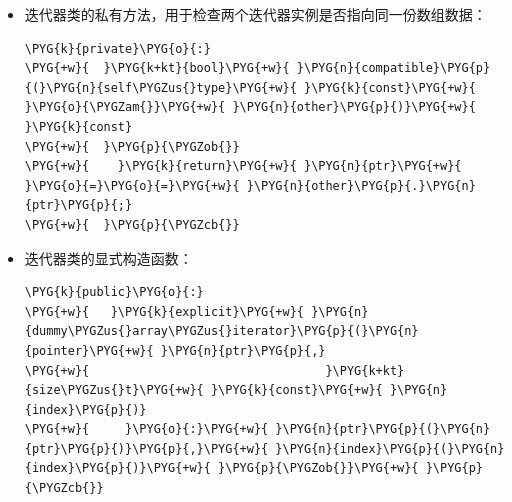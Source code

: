 \begin{itemize}

\begin{codeblockbg}
\begin{Verbatim}[commandchars=\\\{\},breaklines=true,breakanywhere=true,fontsize=\codefont,xleftmargin=17bp]
\PYG{k}{private}\PYG{o}{:}
\PYG{+w}{   }\PYG{n}{pointer}\PYG{+w}{ }\PYG{n}{ptr}\PYG{+w}{ }\PYG{o}{=}\PYG{+w}{ }\PYG{n+nb}{nullptr}\PYG{p}{;}
\PYG{+w}{   }\PYG{k+kt}{size\PYGZus{}t}\PYG{+w}{ }\PYG{n}{index}\PYG{+w}{ }\PYG{o}{=}\PYG{+w}{ }\PYG{l+m+mi}{0}\PYG{p}{;}
\end{Verbatim}
\end{codeblockbg}



\item 迭代器类的私有方法，用于检查两个迭代器实例是否指向同一份数组数据：



\begin{codeblockbg}
\begin{Verbatim}[commandchars=\\\{\},breaklines=true,breakanywhere=true,fontsize=\codefont,xleftmargin=17bp]
\PYG{k}{private}\PYG{o}{:}
\PYG{+w}{  }\PYG{k+kt}{bool}\PYG{+w}{ }\PYG{n}{compatible}\PYG{p}{(}\PYG{n}{self\PYGZus{}type}\PYG{+w}{ }\PYG{k}{const}\PYG{+w}{ }\PYG{o}{\PYGZam{}}\PYG{+w}{ }\PYG{n}{other}\PYG{p}{)}\PYG{+w}{ }\PYG{k}{const}
\PYG{+w}{  }\PYG{p}{\PYGZob{}}
\PYG{+w}{    }\PYG{k}{return}\PYG{+w}{ }\PYG{n}{ptr}\PYG{+w}{ }\PYG{o}{=}\PYG{o}{=}\PYG{+w}{ }\PYG{n}{other}\PYG{p}{.}\PYG{n}{ptr}\PYG{p}{;}
\PYG{+w}{  }\PYG{p}{\PYGZcb{}}
\end{Verbatim}
\end{codeblockbg}



\item 迭代器类的显式构造函数：



\begin{codeblockbg}
\begin{Verbatim}[commandchars=\\\{\},breaklines=true,breakanywhere=true,fontsize=\codefont,xleftmargin=17bp]
\PYG{k}{public}\PYG{o}{:}
\PYG{+w}{   }\PYG{k}{explicit}\PYG{+w}{ }\PYG{n}{dummy\PYGZus{}array\PYGZus{}iterator}\PYG{p}{(}\PYG{n}{pointer}\PYG{+w}{ }\PYG{n}{ptr}\PYG{p}{,}
\PYG{+w}{                                 }\PYG{k+kt}{size\PYGZus{}t}\PYG{+w}{ }\PYG{k}{const}\PYG{+w}{ }\PYG{n}{index}\PYG{p}{)}
\PYG{+w}{     }\PYG{o}{:}\PYG{+w}{ }\PYG{n}{ptr}\PYG{p}{(}\PYG{n}{ptr}\PYG{p}{)}\PYG{p}{,}\PYG{+w}{ }\PYG{n}{index}\PYG{p}{(}\PYG{n}{index}\PYG{p}{)}\PYG{+w}{ }\PYG{p}{\PYGZob{}}\PYG{+w}{ }\PYG{p}{\PYGZcb{}}
\end{Verbatim}
\end{codeblockbg}



\end{itemize}
